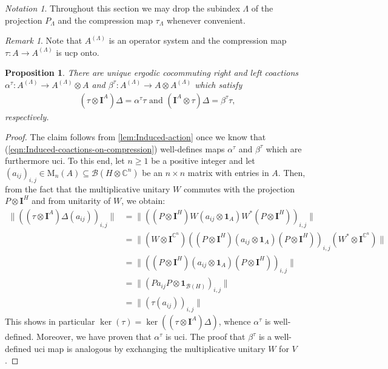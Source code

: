 \documentclass{amsart}
\theoremstyle{plain}
\newtheorem{proposition}[theorem]{Proposition}
\theoremstyle{definition}
\theoremstyle{remark}
\newtheorem{remark}[theorem]{Remark}
\newtheorem{notation}[theorem]{Notation}
\begin{document}
	\begin{notation}
		Throughout this section we may drop the subindex $\Lambda$ of the projection $P_\Lambda$ and the compression map $\tau_\Lambda$ whenever convenient.
	\end{notation}
	
	\begin{remark}\label{rmk:Compression-map-ucp-onto}
		Note that $A^{(\Lambda)}$ is an operator system and the compression map $\tau : A \rightarrow A^{(\Lambda)}$ is ucp onto.
	\end{remark}
	
	\begin{proposition}\label{lem:Induced-Action-on-Toeplitz-System}
		There are unique ergodic cocommuting right and left coactions $\alpha^\tau : A^{(\Lambda)} \rightarrow A^{(\Lambda)} \otimes A$ and $\beta^\tau : A^{(\Lambda)} \rightarrow A \otimes A^{(\Lambda)}$ which satisfy
		\begin{align}\label{eqn:Induced-coactions-on-compression}
			(\tau \otimes \mathbf{I}^A) \Delta = \alpha^\tau\tau \text{ and } (\mathbf{I}^A \otimes \tau) \Delta = \beta^\tau\tau,
		\end{align}
		respectively.
	\end{proposition}
	
	\begin{proof}
		The claim follows from \autoref{lem:Induced-action} once we know that (\ref{eqn:Induced-coactions-on-compression}) well-defines maps $\alpha^{\tau}$ and $\beta^\tau$ which are furthermore uci.
		To this end, let $n \geq 1$ be a positive integer and let $(a_{ij})_{i,j} \in \mathrm{M}_n(A) \subseteq \mathcal{B}(H \otimes \mathbb{C}^n)$ be an $n \times n$ matrix with entries in $A$.
		Then, from the fact that the multiplicative unitary $W$ commutes with the projection $P \otimes \mathbf{I}^H$ and from unitarity of $W$, we obtain:
		\begin{align}
			\lVert \left((\tau \otimes \mathbf{I}^A)\Delta(a_{ij})\right)_{i,j}\rVert
			&= \lVert \left((P \otimes \mathbf{I}^H) W (a_{ij} \otimes \mathbf{1}_A) W^* (P \otimes \mathbf{I}^H)\right)_{i,j}\rVert \\
			&= \lVert (W \otimes \mathbf{I}^{\mathbb{C}^n}) \left((P \otimes \mathbf{I}^H) (a_{ij} \otimes \mathbf{1}_A) (P \otimes \mathbf{I}^H)\right)_{i,j} (W^* \otimes \mathbf{I}^{\mathbb{C}^n})\rVert \\
			&= \lVert \left((P \otimes \mathbf{I}^H) (a_{ij} \otimes \mathbf{1}_A) (P \otimes \mathbf{I}^H)\right)_{i,j} \rVert \\
			&= \lVert\left(Pa_{ij}P \otimes \mathbf{1}_{\mathcal{B}(H)}\right)_{i,j}\rVert \\
			&= \lVert\left(\tau(a_{ij})\right)_{i,j}\rVert
		\end{align}
		This shows in particular $\ker(\tau) = \ker((\tau \otimes \mathbf{I}^A)\Delta)$, whence $\alpha^\tau$ is well-defined.
		Moreover, we have proven that $\alpha^\tau$ is uci.
		The proof that $\beta^\tau$ is a well-defined uci map is analogous by exchanging the multiplicative unitary $W$ for $V$.
	\end{proof}
	
\end{document}
